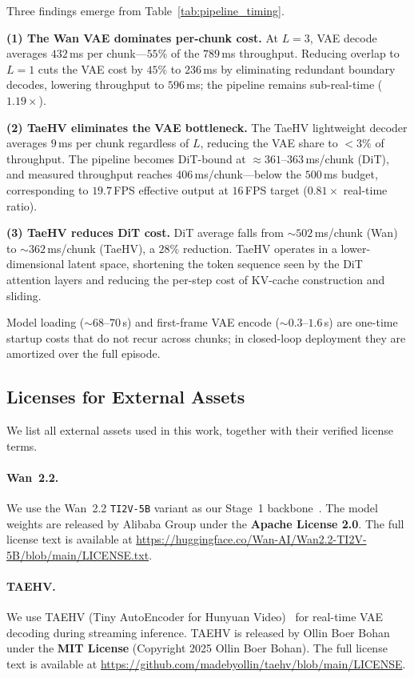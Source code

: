 Three findings emerge from Table~\ref{tab:pipeline_timing}.

\textbf{(1) The Wan VAE dominates per-chunk cost.} At $L{=}3$, VAE decode averages $432$\,ms per chunk---$55\%$ of the $789$\,ms throughput. Reducing overlap to $L{=}1$ cuts the VAE cost by $45\%$ to $236$\,ms by eliminating redundant boundary decodes, lowering throughput to $596$\,ms; the pipeline remains sub-real-time ($1.19\times$).

\textbf{(2) TaeHV eliminates the VAE bottleneck.} The TaeHV lightweight decoder averages $9$\,ms per chunk regardless of $L$, reducing the VAE share to $<3\%$ of throughput. The pipeline becomes DiT-bound at ${\approx}361$--$363$\,ms/chunk (DiT), and measured throughput reaches $406$\,ms/chunk---below the $500$\,ms budget, corresponding to $19.7$\,FPS effective output at $16$\,FPS target ($0.81\times$ real-time ratio).

\textbf{(3) TaeHV reduces DiT cost.} DiT average falls from ${\sim}502$\,ms/chunk (Wan) to ${\sim}362$\,ms/chunk (TaeHV), a $28\%$ reduction. TaeHV operates in a lower-dimensional latent space, shortening the token sequence seen by the DiT attention layers and reducing the per-step cost of KV-cache construction and sliding.

Model loading (${\sim}68$--$70$\,s) and first-frame VAE encode (${\sim}0.3$--$1.6$\,s) are one-time startup costs that do not recur across chunks; in closed-loop deployment they are amortized over the full episode.

\subsection{Licenses for External Assets}
\label{app:licenses}

We list all external assets used in this work, together with their verified license terms.

\paragraph{Wan~2.2.}
We use the Wan~2.2 \texttt{TI2V-5B} variant as our Stage~1 backbone~\citep{wang2025wan}.
The model weights are released by Alibaba Group under the \textbf{Apache License 2.0}.
The full license text is available at \url{https://huggingface.co/Wan-AI/Wan2.2-TI2V-5B/blob/main/LICENSE.txt}.

\paragraph{TAEHV.}
We use TAEHV (Tiny AutoEncoder for Hunyuan Video)~\citep{BoerBohan2025TAEHV} for real-time VAE decoding during streaming inference.
TAEHV is released by Ollin Boer Bohan under the \textbf{MIT License} (Copyright \textcopyright{} 2025 Ollin Boer Bohan).
The full license text is available at \url{https://github.com/madebyollin/taehv/blob/main/LICENSE}.

